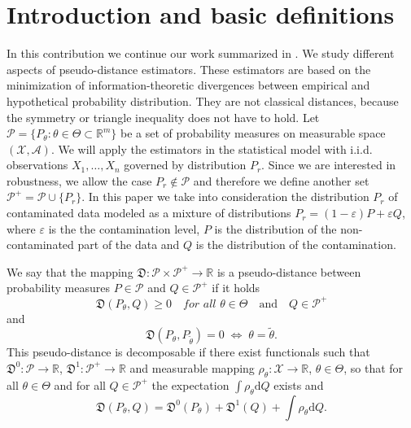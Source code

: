 
{\normalsize


\section{Introduction and basic definitions}
In this contribution we continue our work summarized in \cite{Kucera2012}. We study different aspects of \R pseudo-distance estimators. These estimators are based on the minimization of information-theoretic divergences between empirical and hypothetical probability distribution. They are not classical distances, because the symmetry or triangle inequality does not have to hold. Let $\mathcal{P} = \lbrace P_\theta : \theta \in \Theta \subset \mathbb{R}^m \rbrace$ be a set of probability measures on measurable space $\left(\mathcal{X},\mathcal{A}\right)$.
We will apply the estimators in the statistical model with i.i.d. observations $X_1,\ldots,X_n$ governed by distribution $P_r$.
Since we are interested in robustness, we allow the case $P_r \notin \mathcal{P}$ and therefore we define another set $\mathcal{P}^+ = \mathcal{P} \cup \lbrace P_r \rbrace $. In this paper we take into consideration the distribution $P_r$ of contaminated data modeled as a mixture of distributions $P_r = (1-\varepsilon)P + \varepsilon Q$, where $\varepsilon$ is the the contamination level, $P$ is the distribution of the non-contaminated part of the data and $Q$ is the distribution of the contamination.

\begin{definition}
	We say that the mapping $\mathfrak{D}:\mathcal{P}\times\mathcal{P}^+ \rightarrow \mathbb{R}$ is a pseudo-distance between probability measures $P \in \mathcal{P}$ and $Q \in \mathcal{P}^+$ if it holds		
		\begin{equation}
			\mathfrak{D}(P_\theta,Q) \geq 0 \quad \textit{for all } \theta \in \Theta \quad \text{and} \quad Q \in \mathcal{P}^+
		\end{equation}
		and 		
		\begin{equation}
			\mathfrak{D}(P_\theta,P_{\tilde{\theta}})=0 \; \Leftrightarrow \; \theta=\tilde{\theta}.
		\end{equation}	
	This pseudo-distance is decomposable if there exist functionals such that
		 $\mathfrak{D}^0:\mathcal{P}\rightarrow\mathbb{R}$, $ \mathfrak{D}^1:\mathcal{P}^+ \rightarrow \mathbb{R}$ and measurable mapping
		  $\rho_\theta : \mathcal{X} \rightarrow \mathbb{R}$, $ \theta \in \Theta$, so that for all $\theta \in \Theta$ and for all $Q \in \mathcal{P}^+$ the expectation $\int{\rho_\theta }\mathrm{d}Q$ exists and
		\begin{equation}
			\mathfrak{D} (P_\theta, Q) = \mathfrak{D}^0 (P_\theta) + \mathfrak{D}^1 (Q) + \int \rho_\theta \mathrm{d}Q.
		\end{equation}
\end{definition}

}
